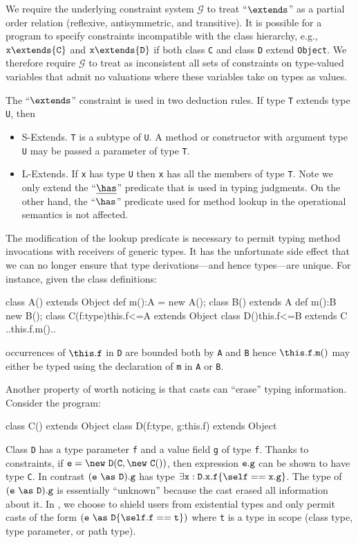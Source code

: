 We require the underlying constraint system $\mathcal{G}$ to treat ``$\extends$'' as a partial order relation (reflexive, antisymmetric, and transitive). It is possible for a program to specify constraints incompatible with the class hierarchy, e.g., ${\tt x}\extends{\tt C}$ and ${\tt x}\extends{\tt D}$ if both class {\tt C} and class {\tt D} extend {\tt Object}. We therefore require $\mathcal{G}$ to treat as inconsistent all sets of constraints on type-valued variables that admit no valuations where these variables take on types as values.

The ``$\extends$'' constraint is used in two deduction rules. If
type {\tt T} extends type {\tt U}, then
\begin{itemize}
\item{\sc S-Extends}. {\tt T} is a subtype of {\tt U}. A method or constructor with argument type {\tt U} may be passed a parameter of type {\tt T}.
\item{\sc L-Extends}. If {\tt x} has type {\tt U} then {\tt x} has all the members of type {\tt T}. Note we only extend the ``$\underline\has$'' predicate that is used in typing judgments. On the other hand, the ``$\has$'' predicate used for method lookup in the operational semantics is not affected.
\end{itemize}

The modification of the lookup predicate is
necessary to permit typing method invocations with receivers of
generic types. It has the unfortunate side effect that we can no
longer ensure that type derivations---and hence types---are unique.
For instance, given the class definitions:
%
\begin{xten}
class A() extends Object { def m():A = new A(); }
class B() extends A { def m():B new B(); }
class C(f:type){this.f<=A} extends Object {}
class D(){this.f<=B} extends C { ..this.f.m().. }
\end{xten}
%
occurrences of $\this.{\tt f}$ in {\tt D} are bounded both by {\tt A} and {\tt B} hence 
$\this.{\tt f}.{\tt m}()$ may either be typed using the declaration of {\tt m} in {\tt A} or {\tt B}.

Another property of \FXG{} worth noticing is that casts can ``erase'' typing information.
Consider the program:
\begin{xten}
class C() extends Object {}
class D(f:type, g:this.f) extends Object {}
\end{xten}
Class {\tt D} has a type parameter {\tt f} and a value field {\tt g} of type {\tt f}.
Thanks to constraints, if
${\tt e}=\new~{\tt D}({\tt C},\new~{\tt C}())$,
then expression ${\tt e}.{\tt g}$ can be shown to
have type {\tt C}.
In contrast $({\tt e}~\as~{\tt D}).{\tt g}$ has type
$\exists {\tt x}:{\tt D}.{\tt x}.{\tt f}\{\self=={\tt x.g}\}$.
The type of $({\tt e}~\as~{\tt D}).{\tt g}$ is essentially ``unknown''
because the cast erased all information about it. In \Xten, we choose to shield users from existential types and only permit casts of the form $({\tt e}~\as~{\tt D}\{\self.{\tt f}=={\tt t}\})$ where {\tt t} is a type in scope (class type, type parameter, or path type).


